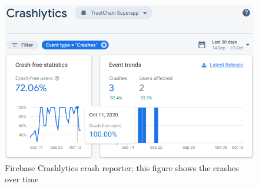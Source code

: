 \begin{figure}
    \includegraphics[width=0.8\linewidth]{implementation/firebase-crashlytics.png}
    \caption{Firebase Crashlytics crash reporter; this figure shows the crashes over time}
    \label{fig:firebase-crashlytics}
\end{figure}